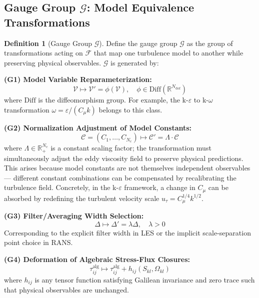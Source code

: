 \documentclass[12pt,a4paper]{article}
\theoremstyle{plain}
\theoremstyle{definition}
\newtheorem{definition}[theorem]{Definition}
\theoremstyle{remark}
\newcommand{\R}{\mathbb{R}}
\newcommand{\F}{\mathcal{F}}
\newcommand{\G}{\mathcal{G}}
\newcommand{\eps}{\varepsilon}
\newcommand{\Diff}{\mathrm{Diff}}
\begin{document}
\subsection{Gauge Group $\G$: Model Equivalence Transformations}

\begin{definition}[Gauge Group $\G$]
Define the gauge group $\G$ as the group of transformations acting on $\F$ that map one turbulence model to another while preserving physical observables. $\G$ is generated by:

\textbf{(G1) Model Variable Reparameterization:}
\begin{equation}
\mathcal{V} \mapsto \mathcal{V}' = \phi(\mathcal{V}), \quad \phi \in \Diff(\R^{N_{\text{dof}}})
\end{equation}
where $\Diff$ is the diffeomorphism group. For example, the k-$\eps$ to k-$\omega$ transformation $\omega = \eps/(C_\mu k)$ belongs to this class.

\textbf{(G2) Normalization Adjustment of Model Constants:}
\begin{equation}
\mathcal{C} = (C_1,\dots,C_{N_c}) \mapsto \mathcal{C}' = \Lambda \cdot \mathcal{C}
\end{equation}
where $\Lambda \in \R_+^{N_c}$ is a constant scaling factor; the transformation must simultaneously adjust the eddy viscosity field to preserve physical predictions. This arises because model constants are not themselves independent observables --- different constant combinations can be compensated by recalibrating the turbulence field. Concretely, in the k-$\eps$ framework, a change in $C_\mu$ can be absorbed by redefining the turbulent velocity scale $u_\tau = C_\mu^{1/4}k^{1/2}$.

\textbf{(G3) Filter/Averaging Width Selection:}
\begin{equation}
\Delta \mapsto \Delta' = \lambda\Delta, \quad \lambda>0
\end{equation}
Corresponding to the explicit filter width in LES or the implicit scale-separation point choice in RANS.

\textbf{(G4) Deformation of Algebraic Stress-Flux Closures:}
\begin{equation}
\tau_{ij}^{\text{alg}} \mapsto \tau_{ij}^{\text{alg}} + h_{ij}(S_{kl}, \Omega_{kl})
\end{equation}
where $h_{ij}$ is any tensor function satisfying Galilean invariance and zero trace such that physical observables are unchanged.
\end{definition}
\end{document}

